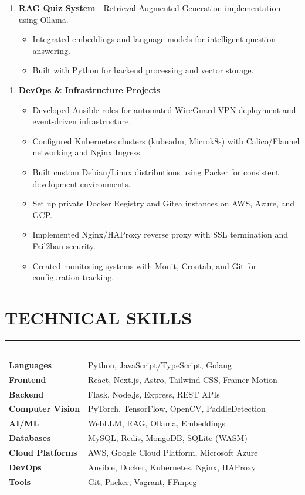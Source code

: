 \documentclass{article}
\begin{document}
\begin{enumerate}
    \item \textbf{RAG Quiz System} - Retrieval-Augmented Generation implementation using Ollama.
   \begin{itemize}
    \item Integrated embeddings and language models for intelligent question-answering.
    \item Built with Python for backend processing and vector storage.
   \end{itemize}
\end{enumerate}

\begin{enumerate}
    \item \textbf{DevOps \& Infrastructure Projects}
   \begin{itemize}
    \item Developed Ansible roles for automated WireGuard VPN deployment and event-driven infrastructure.
    \item Configured Kubernetes clusters (kubeadm, Microk8s) with Calico/Flannel networking and Nginx Ingress.
    \item Built custom Debian/Linux distributions using Packer for consistent development environments.
    \item Set up private Docker Registry and Gitea instances on AWS, Azure, and GCP.
    \item Implemented Nginx/HAProxy reverse proxy with SSL termination and Fail2ban security.
    \item Created monitoring systems with Monit, Crontab, and Git for configuration tracking.
   \end{itemize}
\end{enumerate}


\section* {TECHNICAL SKILLS}
\hrule 
\subsection*{}
\begin{tabular}{ @{} >{\bfseries}l @{\hspace{5ex}} l }
Languages & Python, JavaScript/TypeScript, Golang \\
Frontend & React, Next.js, Astro, Tailwind CSS, Framer Motion \\
Backend & Flask, Node.js, Express, REST APIs \\
Computer Vision & PyTorch, TensorFlow, OpenCV, PaddleDetection \\
AI/ML & WebLLM, RAG, Ollama, Embeddings \\
Databases & MySQL, Redis, MongoDB, SQLite (WASM) \\
Cloud Platforms & AWS, Google Cloud Platform, Microsoft Azure \\
DevOps & Ansible, Docker, Kubernetes, Nginx, HAProxy \\
Tools & Git, Packer, Vagrant, FFmpeg \\
\end{tabular}
   
\end{document}
